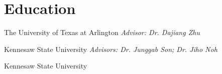 \section{Education}
The University of Texas at Arlington \hfill \textit{Advisor: Dr. Dajiang Zhu}\par
\vspace{4pt}
Kennesaw State University \hfill \textit{Advisors: Dr. Junggab Son; Dr. Jiho Noh}\par
\vspace{4pt}
Kennesaw State University\par
